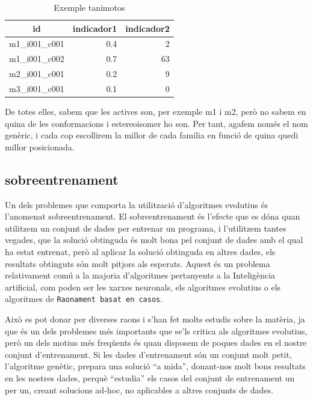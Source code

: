 \documentclass[titlepage,a4paper,12pt]{book}
\begin{document}
\begin{table}
\centering
\caption{Exemple tanimotos}
\begin{tabular}{|l|r|r|}
\hline
\multicolumn{1}{|c|}{\textbf{id }} & \multicolumn{1}{c|}{\textbf{ indicador1 }} & \multicolumn{1}{c|}{\textbf{ indicador2}} \\
\hline
\hline
m1\_i001\_c001 & 0.4 & 2  \\
m1\_i001\_c002 & 0.7 & 63 \\
m2\_i001\_c001 & 0.2 & 9  \\
m3\_i001\_c001 & 0.1 & 0  \\
\hline
\end{tabular}
\end{table}

De totes elles, sabem que les actives son, per exemple m1 i m2, però no sabem
en quina de les conformacions i estereoisomer ho son.  Per tant, agafem només el
nom genèric, i cada cop escollirem la millor de cada familia en funció de quina
quedi millor posicionada.



\subsection{sobreentrenament} %
\label{sub:sobreentrenament}

Un dels problemes que comporta la utilització d'algoritmes evolutius és
l'anomenat sobreentrenament.  El sobreentrenament és l'efecte que es dóna quan
utilitzem un conjunt de dades per entrenar un programa, i l'utilitzem tantes
vegades, que la solució obtinguda és molt bona pel conjunt de dades amb el qual
ha estat entrenat, però al aplicar la solució obtinguda en altres dades, els
resultats obtinguts són molt pitjors als esperats.  Aquest és un problema
relativament comú a la majoria d'algoritmes pertanyents a la Inteligència
artificial, com poden ser les xarxes neuronals, els algoritmes evolutius o els
algoritmes de \texttt{Raonament basat en casos}.

Això es pot donar per diverses raons i s'han fet molts estudis sobre la
matèria, ja que és un dels problemes més importants que se'ls critica als
algoritmes evolutius, però un dels motius més freqüents és quan
disposem de poques dades en el nostre conjunt d'entrenament.  Si les dades
d'entrenament són un conjunt molt petit, l'algoritme genètic, prepara una
solució ``a mida'', donant-nos molt bons resultats en les nostres dades, perquè
``estudia'' els casos del conjunt de entrenament un per un, creant solucions
ad-hoc, no aplicables a altres conjunts de dades.
\end{document}
